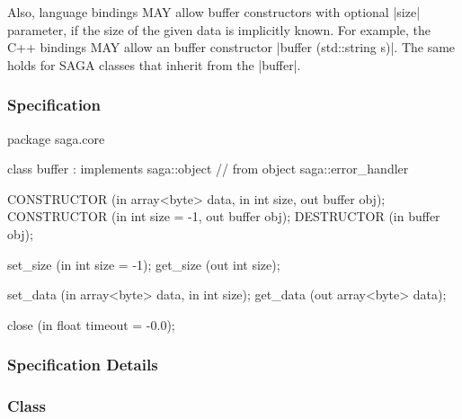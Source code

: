  Also, language bindings MAY allow buffer constructors with
 optional |size| parameter, if the size of the given data is
 implicitly known.  For example, the C++ bindings MAY allow an
 buffer constructor |buffer (std::string s)|.  The same holds
 for SAGA classes that inherit from the |buffer|.
 
 \newpage
 
 \subsubsection{Specification}
 
 \begin{myspec}
  package saga.core
  {
    class buffer : implements   saga::object
                // from object  saga::error_handler
    {
      CONSTRUCTOR (in  array<byte>  data,
                   in  int          size,
                   out buffer       obj);
      CONSTRUCTOR (in  int          size = -1,
                   out buffer       obj);
      DESTRUCTOR  (in  buffer       obj);
 
      set_size    (in  int          size = -1);
      get_size    (out int          size);
 
      set_data    (in  array<byte>  data, 
                   in  int          size);
      get_data    (out array<byte>  data);
 
      close       (in  float        timeout = -0.0);
    }
  }
 \end{myspec}
 
 
 \subsubsection{Specification Details}
 
 \subsubsection*{Class }
 
